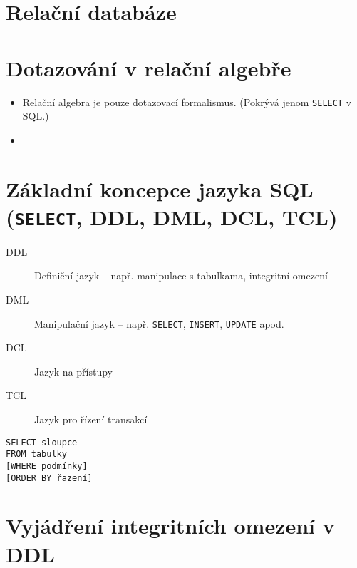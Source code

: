 \documentclass{../szzclass}
\begin{document}
\section{Relační databáze}
\section{Dotazování v relační algebře}
\begin{itemize}
  \item Relační algebra je pouze dotazovací formalismus. (Pokrývá jenom \texttt{SELECT} v SQL.)
  \item 
\end{itemize}
\section{Základní koncepce jazyka SQL (\texttt{SELECT}, DDL, DML, DCL, TCL)}
\begin{description}
  \item[DDL] Definiční jazyk -- např. manipulace s tabulkama, integritní omezení
  \item[DML] Manipulační jazyk -- např. \texttt{SELECT}, \texttt{INSERT}, \texttt{UPDATE} apod.
  \item[DCL] Jazyk na přístupy
  \item[TCL] Jazyk pro řízení transakcí
\end{description}

\begin{verbatim}
SELECT sloupce
FROM tabulky
[WHERE podmínky]
[ORDER BY řazení]
\end{verbatim}

\section{Vyjádření integritních omezení v DDL}
\end{document}
